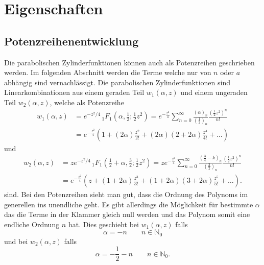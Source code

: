 %
%
%
\section{Eigenschaften
\label{parzyl:section:Eigenschaften}}

\subsection{Potenzreihenentwicklung
	\label{parzyl:potenz}}
Die parabolischen Zylinderfunktionen können auch als Potenzreihen geschrieben werden.
Im folgenden Abschnitt werden die Terme welche nur von $n$ oder $a$ abhängig sind vernachlässigt.
Die parabolischen Zylinderfunktionen sind Linearkombinationen aus einem geraden Teil $w_1(\alpha, z)$ 
und einem ungeraden Teil $w_2(\alpha, z)$, welche als Potenzreihe
\begin{align}
	w_1(\alpha,z)
	&=  
	e^{-z^2/4} \,
	{}_{1} F_{1}
	(
	\alpha, {\textstyle \frac{1}{2}} ; {\textstyle \frac{1}{2}}z^2) 
	= 
	e^{-\frac{z^2}{4}}
	\sum^{\infty}_{n=0}
	\frac{\left ( \alpha \right )_{n}}{\left ( \frac{1}{2}\right )_{n}}
	\frac{\left ( \frac{1}{2} z^2\right )^n}{n!} \\
	&=
	e^{-\frac{z^2}{4}}
	\left ( 
	1 
	+
	\left ( 2\alpha \right )\frac{z^2}{2!}
	+
	\left ( 2\alpha \right )\left ( 2 + 2\alpha \right )\frac{z^4}{4!}  
	+
	\dots
	\right )
\end{align}
und
\begin{align}
	w_2(\alpha,z)
	&=  
	ze^{-z^2/4} \,
	{}_{1} F_{1}
	(
	{\textstyle \frac{1}{2}} 
	+ \alpha, {\textstyle \frac{3}{2}} ; {\textstyle \frac{1}{2}}z^2) 
	= 
	ze^{-\frac{z^2}{4}}
	\sum^{\infty}_{n=0}
	\frac{\left ( \frac{3}{4} - k \right )_{n}}{\left ( \frac{3}{2}\right )_{n}}
	\frac{\left ( \frac{1}{2} z^2\right )^n}{n!} \\
	&=
	e^{-\frac{z^2}{4}}
	\left ( 
	z 
	+
	\left ( 1 + 2\alpha \right )\frac{z^3}{3!}
	+
	\left ( 1 + 2\alpha \right )\left ( 3 + 2\alpha \right )\frac{z^5}{5!}  
	+
	\dots
	\right ).
\end{align}
sind.
Bei den Potenzreihen sieht man gut, dass die Ordnung des Polynoms im generellen ins unendliche geht. 
Es gibt allerdings die Möglichkeit für bestimmte $\alpha$ das die Terme in der Klammer gleich null werden 
und das Polynom somit eine endliche Ordnung $n$ hat. Dies geschieht bei $w_1(\alpha,z)$ falls
\begin{equation}
	\alpha =  -n \qquad n \in \mathbb{N}_0
\end{equation}
und bei $w_2(\alpha,z)$ falls
\begin{equation}
	\alpha = -\frac{1}{2} - n \qquad n \in \mathbb{N}_0.
\end{equation}

